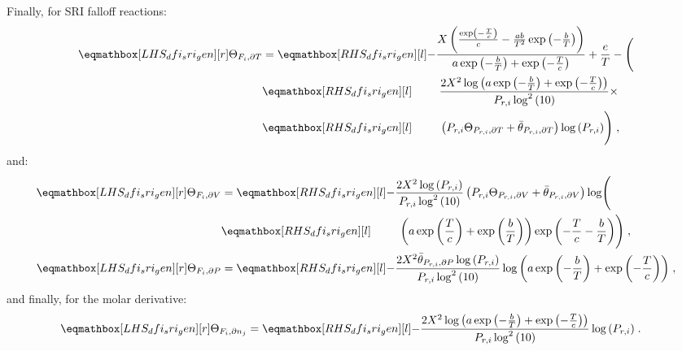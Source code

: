 \documentclass[12pt,number,sort&compress]{elsarticle}
\begin{document}
Finally, for SRI falloff reactions:
\begin{align}
 \label{e:dfi_sri_dt_prod}
 \lhs{dfi_sri_gen}{\Theta_{F_i, \partial T}} &=
 \rhs{dfi_sri_gen}{- \frac{X \left(\frac{\operatorname{exp}\left({- \frac{T}{c}}\right)}{c} - \frac{a b}{T^{2}} \operatorname{exp}\left({- \frac{b}{T}}\right)\right)}{a \operatorname{exp}\left({- \frac{b}{T}}\right) + \operatorname{exp}\left({- \frac{T}{c}}\right)} + \frac{e}{T} - \Biggl(} \nonumber \\
 &\rhs{dfi_sri_gen}{\mathindent \frac{2 X^{2} \log{\left (a \operatorname{exp}\left({- \frac{b}{T}}\right) + \operatorname{exp}\left({- \frac{T}{c}}\right) \right )}}{P_{r, i} \log^{2}{\left (10 \right )}} \times } \nonumber \\
 &\rhs{dfi_sri_gen}{\mathindent \left(P_{r, i} \Theta_{P_{r,i}, \partial T} + \bar{\theta}_{P_{r, i}, \partial T}\right) \log{\left (P_{r, i} \right ) \Biggr)}}\;,
\end{align}
and:
\begin{subequations}
 \label{e:dfi_sri_de_prod}
 \begin{align}
  \lhs{dfi_sri_gen}{\Theta_{F_i, \partial V}} &=
  \rhs{dfi_sri_gen}{- \frac{2 X^{2} \log{\left (P_{r, i} \right )}}{P_{r, i} \log^{2}{\left (10 \right )}} \left(P_{r, i} \Theta_{P_{r,i}, \partial V} + \bar{\theta}_{P_{r, i}, \partial V}\right) \log \Biggl(} \nonumber \\
& \rhs{dfi_sri_gen}{\mathindent \left( a \operatorname{exp}\left({\frac{T}{c}}\right) + \operatorname{exp}\left({\frac{b}{T}}\right)\right) \operatorname{exp}\left({- \frac{T}{c} - \frac{b}{T}}\right) \Biggr)}\;, \\
  \lhs{dfi_sri_gen}{\Theta_{F_i, \partial P}} &=
  \rhs{dfi_sri_gen}{- \frac{2 X^{2} \bar{\theta}_{P_{r, i}, \partial P} \log{\left (P_{r, i} \right )}}{P_{r, i} \log^{2}{\left (10 \right )}} \log{\left (a \operatorname{exp}\left({- \frac{b}{T}}\right) + \operatorname{exp}\left({- \frac{T}{c}}\right) \right )}}\;,
 \end{align}
\end{subequations}
and finally, for the molar derivative:
\begin{align}
 \label{e:dfi_sri_dnj_prod}
 \lhs{dfi_sri_gen}{\Theta_{F_i, \partial n_j}} &= \rhs{dfi_sri_gen}{- \frac{2 X^{2} \log{\left (a \operatorname{exp}\left({- \frac{b}{T}}\right) + \operatorname{exp}\left({- \frac{T}{c}}\right) \right )}}{P_{r, i} \log^{2}{\left (10 \right )}} \log{\left (P_{r, i} \right )}}\;.
\end{align}
\end{document}
